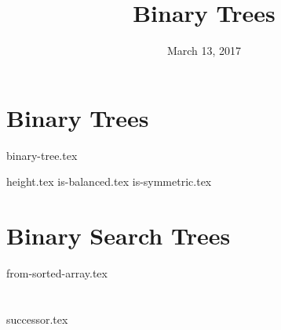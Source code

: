 \documentclass[11pt]{exam}
\title{Binary Trees}
\date{March 13, 2017}
\begin{document}
\maketitle

\section{Binary Trees}
{binary-tree.tex}
\begin{questions}
{height.tex}
{is-balanced.tex}
\clearpage
{}\vspace*{-2em}
{is-symmetric.tex}
\end{questions}

\clearpage

\section{Binary Search Trees}
\begin{questions}
{from-sorted-array.tex}
\end{questions}

\clearpage

\section{}
\begin{questions}
{successor.tex}
\end{questions}
\end{document}
